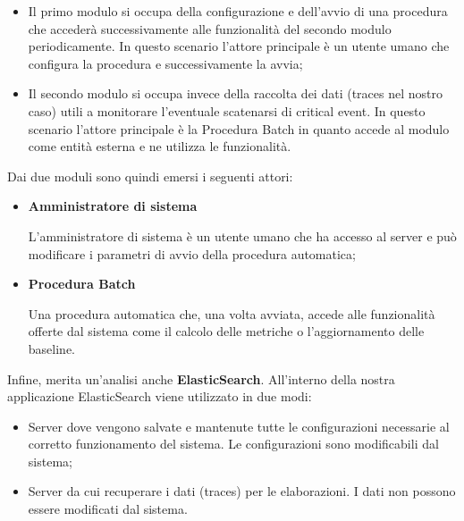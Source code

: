         \begin{itemize}

            \item Il primo modulo si occupa della configurazione e dell'avvio di una procedura  che accederà successivamente
            alle funzionalità del secondo modulo periodicamente. In questo scenario l'attore principale è un utente umano
            che configura la procedura e successivamente la avvia;
            \item Il secondo modulo si occupa invece della raccolta dei dati (traces nel nostro caso) utili a monitorare l'eventuale
            scatenarsi di critical event. In questo scenario l'attore principale è la Procedura Batch in quanto accede al
            modulo come entità esterna e ne utilizza le funzionalità.

        \end{itemize}

        Dai due moduli sono quindi emersi i seguenti attori:

        \begin{itemize}

            \item \textbf{Amministratore di sistema}

                L'amministratore di sistema è un utente umano che ha accesso al server  e può modificare i
                parametri di avvio della procedura automatica;

            \item \textbf{Procedura Batch}

                Una procedura automatica che, una volta avviata, accede alle funzionalità offerte dal sistema come il calcolo
                delle metriche o l'aggiornamento delle baseline.

        \end{itemize}

        Infine, merita un'analisi anche \textbf{ElasticSearch}. All'interno della nostra applicazione ElasticSearch viene utilizzato
        in due modi:

        \begin{itemize}

            \item Server dove vengono salvate e mantenute tutte le configurazioni necessarie al corretto funzionamento del
            sistema. Le configurazioni sono modificabili dal sistema;
            \item Server da cui recuperare i dati (traces) per le elaborazioni. I dati non possono essere modificati dal
            sistema.

        \end{itemize}

